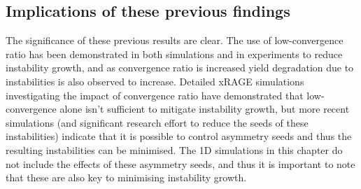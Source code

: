 \subsection{Implications of these previous findings} 
The significance of these previous results are clear. The use of low-convergence ratio has been demonstrated in both simulations and in experiments to reduce instability growth, and as convergence ratio is increased yield degradation due to instabilities is also observed to increase. Detailed xRAGE simulations investigating the impact of convergence ratio \cite{Haines2017a} have demonstrated that low-convergence alone isn't sufficient to mitigate instability growth, but more recent simulations (and significant research effort to reduce the seeds of these instabilities) indicate that it is possible to control asymmetry seeds and thus the resulting instabilities can be minimised. The 1D simulations in this chapter do not include the effects of these asymmetry seeds, and thus it is important to note that these are also key to minimising instability growth.



